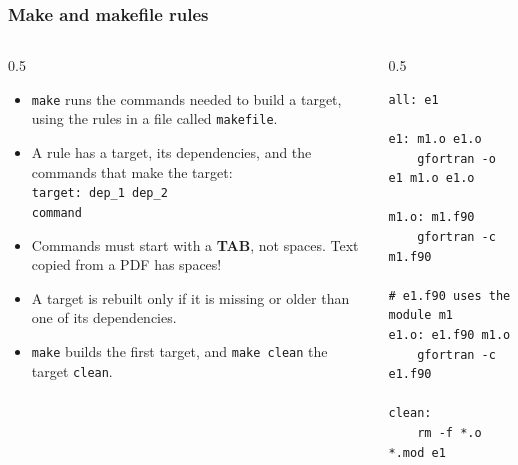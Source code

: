 \begin{frame}[fragile]
  \frametitle{Make and makefile rules}
  \begin{columns}[T]
    \begin{column}{0.5\textwidth}
      \begin{itemize}
        \item \texttt{make} runs the commands needed to build a target, using the rules in a file called \texttt{makefile}.
        \item A rule has a target, its dependencies, and the commands that make the target:\\[1mm]
          \texttt{target: dep\_1 dep\_2}\\
          \texttt{\phantom{xxxx}command}
        \item Commands must start with a \textbf{TAB}, not spaces. Text copied from a PDF has spaces!
        \item A target is rebuilt only if it is missing or older than one of its dependencies.
        \item \texttt{make} builds the first target, and \texttt{make clean} the target \texttt{clean}.
      \end{itemize}
    \end{column}

    \begin{column}{0.5\textwidth}
      \begin{lstlisting}[language={[gnu]make}, tabsize=4]
all: e1

e1: m1.o e1.o
	gfortran -o e1 m1.o e1.o

m1.o: m1.f90
	gfortran -c m1.f90

# e1.f90 uses the module m1
e1.o: e1.f90 m1.o
	gfortran -c e1.f90

clean:
	rm -f *.o *.mod e1
      \end{lstlisting}
    \end{column}
  \end{columns}
\end{frame}


